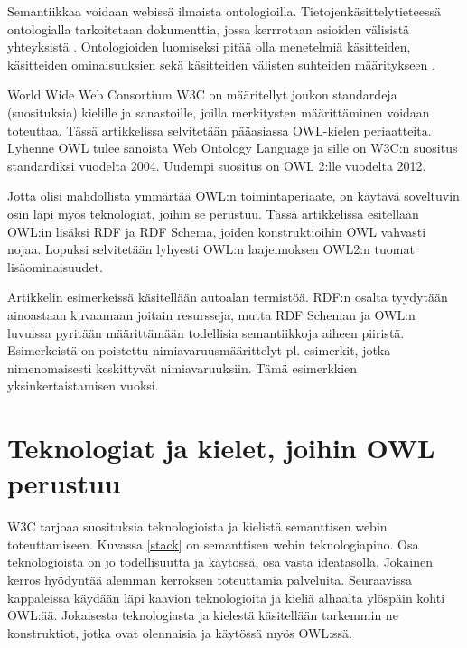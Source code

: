 \documentclass[finnish]{tktltiki2}
\theoremstyle{definition}
\theoremstyle{remark}
\begin{document}
Semantiikkaa voidaan webissä ilmaista ontologioilla. Tietojenkäsittelytieteessä
ontologialla tarkoitetaan dokumenttia, jossa kerrrotaan asioiden välisistä
yhteyksistä \cite{BHL01}.
Ontologioiden luomiseksi pitää olla menetelmiä käsitteiden, käsitteiden
ominaisuuksien sekä käsitteiden välisten suhteiden määritykseen
\cite{BHL01}. 

World Wide Web Consortium W3C on määritellyt 
joukon standardeja (suosituksia) kielille ja sanastoille, joilla merkitysten määrittäminen voidaan toteuttaa.
Tässä artikkelissa selvitetään pääasiassa OWL-kielen periaatteita. Lyhenne OWL tulee sanoista Web Ontology Language ja sille on
W3C:n suositus standardiksi vuodelta 2004. Uudempi suositus on OWL 2:lle vuodelta 2012. 

Jotta olisi mahdollista ymmärtää OWL:n toimintaperiaate, on käytävä soveltuvin osin läpi myös teknologiat, joihin
se perustuu. Tässä artikkelissa esitellään OWL:in lisäksi RDF ja RDF Schema, joiden konstruktioihin OWL vahvasti nojaa. 
Lopuksi selvitetään lyhyesti OWL:n laajennoksen OWL2:n tuomat lisäominaisuudet.

Artikkelin esimerkeissä käsitellään autoalan termistöä. RDF:n osalta tyydytään ainoastaan kuvaamaan joitain resursseja, 
mutta RDF Scheman ja OWL:n luvuissa pyritään määrittämään todellisia semantiikkoja aiheen piiristä. Esimerkeistä on poistettu nimiavaruusmäärittelyt
pl. esimerkit, jotka nimenomaisesti keskittyvät nimiavaruuksiin. Tämä esimerkkien yksinkertaistamisen vuoksi. 

\section{Teknologiat ja kielet, joihin OWL perustuu}
W3C tarjoaa suosituksia teknologioista ja
kielistä  semanttisen webin toteuttamiseen. Kuvassa \ref{stack} on semanttisen webin teknologiapino.
Osa teknologioista on jo todellisuutta ja
käytössä, osa vasta ideatasolla. Jokainen kerros hyödyntää alemman kerroksen toteuttamia
palveluita. Seuraavissa kappaleissa käydään läpi kaavion teknologioita ja kieliä
alhaalta ylöspäin kohti OWL:ää. Jokaisesta teknologiasta ja kielestä käsitellään tarkemmin
ne konstruktiot, jotka ovat olennaisia ja käytössä myös OWL:ssä.
\end{document}
